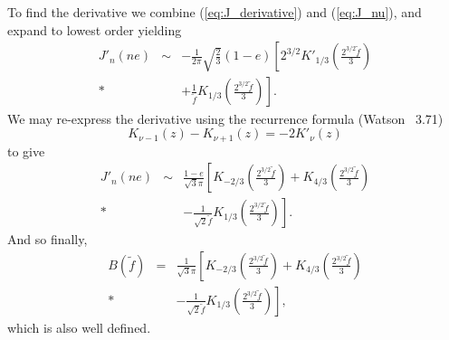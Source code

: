 \documentclass[aps,prd,amsfonts,amssymb,amsmath,nofootinbib,floatfix,reprint,showpacs,groupedaddress]{revtex4-1}
\newcommand{\eqnref}[1]{(\ref{eq:#1})}
\newcommand{\recip}[1]{\ensuremath{\frac{1}{#1}}}
\begin{document}
To find the derivative we combine \eqnref{J_derivative} and \eqnref{J_nu}, and expand to lowest order yielding
\begin{eqnarray}
J'_n(ne) & \sim & -\frac{1}{2\pi}\sqrt{\frac{2}{3}}(1-e)\left[2^{3/2}K'_{1/3}\left(\frac{2^{3/2}\tilde{f}}{3}\right) \right. \nonumber \\*
 & & \left. + \recip{\tilde{f}}K_{1/3}\left(\frac{2^{3/2}\tilde{f}}{3}\right)\right].
\end{eqnarray}
We may re-express the derivative using the recurrence formula (Watson~\cite{Watson1995} 3.71)
\begin{equation}
K_{\nu-1}(z) - K_{\nu+1}(z) = -2K'_\nu(z)
\end{equation}
to give
\begin{eqnarray}
J'_n(ne) & \sim & \frac{1-e}{\sqrt{3}\pi}\left[K_{-2/3}\left(\frac{2^{3/2}\tilde{f}}{3}\right) + K_{4/3}\left(\frac{2^{3/2}\tilde{f}}{3}\right) \right. \nonumber \\*
 & & \left. - \recip{\sqrt{2}\tilde{f}}K_{1/3}\left(\frac{2^{3/2}\tilde{f}}{3}\right)\right].
\end{eqnarray}
And so finally,
\begin{eqnarray}
B(\tilde{f}) & = & \recip{\sqrt{3}\pi}\left[K_{-2/3}\left(\frac{2^{3/2}\tilde{f}}{3}\right) + K_{4/3}\left(\frac{2^{3/2}\tilde{f}}{3}\right) \right. \nonumber \\*
 & & \left. - \recip{\sqrt{2}\tilde{f}}K_{1/3}\left(\frac{2^{3/2}\tilde{f}}{3}\right)\right],
\end{eqnarray}
which is also well defined.
\end{document}
